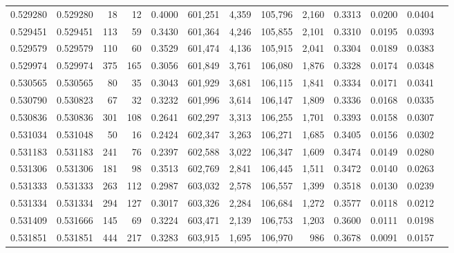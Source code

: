 \begin{tabular}{rrrrrrrrrrrrr}
0.529280 & 0.529280 &    18 &    12 &                                     0.4000 & 601,251 &   4,359 & 105,796 &   2,160 & 0.3313 & 0.0200 & 0.0404 \\
0.529451 & 0.529451 &   113 &    59 &                                     0.3430 & 601,364 &   4,246 & 105,855 &   2,101 & 0.3310 & 0.0195 & 0.0393 \\
0.529579 & 0.529579 &   110 &    60 &                                     0.3529 & 601,474 &   4,136 & 105,915 &   2,041 & 0.3304 & 0.0189 & 0.0383 \\
0.529974 & 0.529974 &   375 &   165 &                                     0.3056 & 601,849 &   3,761 & 106,080 &   1,876 & 0.3328 & 0.0174 & 0.0348 \\
0.530565 & 0.530565 &    80 &    35 &                                     0.3043 & 601,929 &   3,681 & 106,115 &   1,841 & 0.3334 & 0.0171 & 0.0341 \\
0.530790 & 0.530823 &    67 &    32 &                                     0.3232 & 601,996 &   3,614 & 106,147 &   1,809 & 0.3336 & 0.0168 & 0.0335 \\
0.530836 & 0.530836 &   301 &   108 &                                     0.2641 & 602,297 &   3,313 & 106,255 &   1,701 & 0.3393 & 0.0158 & 0.0307 \\
0.531034 & 0.531048 &    50 &    16 &                                     0.2424 & 602,347 &   3,263 & 106,271 &   1,685 & 0.3405 & 0.0156 & 0.0302 \\
0.531183 & 0.531183 &   241 &    76 &                                     0.2397 & 602,588 &   3,022 & 106,347 &   1,609 & 0.3474 & 0.0149 & 0.0280 \\
0.531306 & 0.531306 &   181 &    98 &                                     0.3513 & 602,769 &   2,841 & 106,445 &   1,511 & 0.3472 & 0.0140 & 0.0263 \\
0.531333 & 0.531333 &   263 &   112 &                                     0.2987 & 603,032 &   2,578 & 106,557 &   1,399 & 0.3518 & 0.0130 & 0.0239 \\
0.531334 & 0.531334 &   294 &   127 &                                     0.3017 & 603,326 &   2,284 & 106,684 &   1,272 & 0.3577 & 0.0118 & 0.0212 \\
0.531409 & 0.531666 &   145 &    69 &                                     0.3224 & 603,471 &   2,139 & 106,753 &   1,203 & 0.3600 & 0.0111 & 0.0198 \\
0.531851 & 0.531851 &   444 &   217 &                                     0.3283 & 603,915 &   1,695 & 106,970 &     986 & 0.3678 & 0.0091 & 0.0157 \\

\end{tabular}
